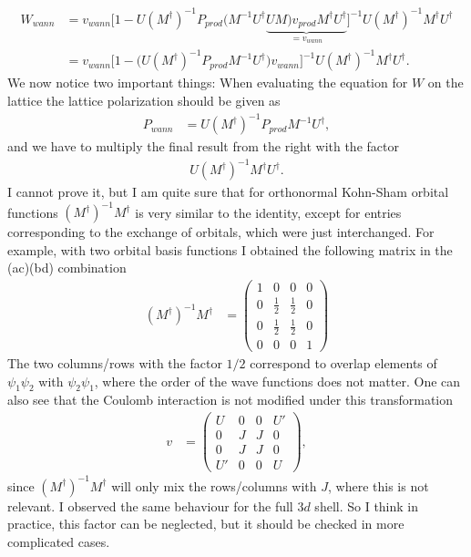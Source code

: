 \documentclass[12pt,a4paper]{scrartcl}
\numberwithin{equation}{section}
\begin{document}
\begin{align}
 W_{wann}  
 &=  v_{wann} \Big[ 1 - U (M^{\dagger})^{-1}  P_{prod} \Big( M^{-1} U^{\dagger} \underbrace{ U M \Big) v_{prod}  M^{\dagger} U^{\dagger} }_{=v_{wann}} \Big]^{-1} U (M^{\dagger})^{-1}M^{\dagger} U^{\dagger} \\
 &=  v_{wann} \Big[ 1 - \Big( U (M^{\dagger})^{-1}  P_{prod}  M^{-1} U^{\dagger} \Big) v_{wann} \Big]^{-1} U (M^{\dagger})^{-1}M^{\dagger} U^{\dagger} .
\end{align}
We now notice two important things: When evaluating the equation for $W$ on the lattice 
the lattice polarization should be given as
\begin{align}
 P_{wann} &= U (M^{\dagger})^{-1}  P_{prod}  M^{-1} U^{\dagger},
\end{align}
and we have to multiply the final result from the right with the factor
\begin{align}
 U (M^{\dagger})^{-1}M^{\dagger} U^{\dagger}.
\end{align}
I cannot prove it, but I am quite sure that for orthonormal Kohn-Sham orbital functions 
$(M^{\dagger})^{-1}M^{\dagger}$ is very similar to the identity, except for entries corresponding to the exchange
of orbitals, which were just interchanged. For example, with two orbital basis functions I obtained the following matrix
in the (ac)(bd) combination
\begin{align}
 (M^{\dagger})^{-1}M^{\dagger}
 &=
 \begin{pmatrix}
 1 & 0 & 0 & 0 \\ 
 0 & \frac{1}{2} & \frac{1}{2} & 0 \\
 0 & \frac{1}{2} & \frac{1}{2} & 0 \\
 0 & 0 & 0 & 1 
 \end{pmatrix}
\end{align}
The two columns/rows with the factor $1/2$ correspond to overlap elements 
of $\psi_1\psi_2$ with $\psi_2\psi_1$, where the order of the wave functions does not matter.
One can also see that the Coulomb interaction is not modified under this transformation
\begin{align}
 v
 &=
 \begin{pmatrix}
 U & 0 & 0 & U' \\ 
 0 & J & J & 0 \\
 0 & J & J & 0 \\
 U' & 0 & 0 & U
 \end{pmatrix},
\end{align}
since $(M^{\dagger})^{-1}M^{\dagger}$ will only mix the rows/columns with $J$, where this is not relevant.
I observed the same behaviour for the full $3d$ shell. 
So I think in practice, this factor can be neglected, but it should be checked in more complicated cases.
\end{document}
